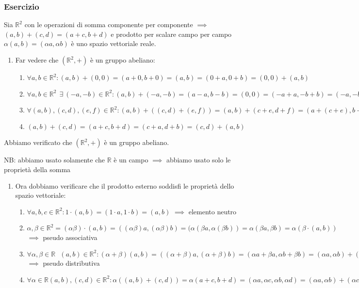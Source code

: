 \documentclass[../main.tex]{subfiles}
\begin{document}
\subsubsection{Esercizio}
Sia $\mathbb{R}^2$ con le operazioni di somma componente per componente
$\implies$ $(a, b) + (c, d) = (a+c, b+d)$ e prodotto per scalare campo per
campo $\alpha(a,b) = (\alpha a, \alpha b)$ è uno spazio vettoriale reale.

\begin{enumerate}
    \item Far vedere che $(\mathbb{R}^2,+)$ è un gruppo abeliano:
          \begin{enumerate}
              \item $\forall a,b \in \mathbb{R}^2 : (a,b)+(0,0) = (a+0, b+0) = (a,b) = (0+a, 0+b) = (0,0)+(a,b)$
              \item $\forall a,b \in \mathbb{R}^2 \ \ \exists \ (-a, -b) \in \mathbb{R}^2:(a,b)+(-a, -b) = (a-a, b-b) = (0,0) = (-a+a, -b+b) = (-a, -b)+(a,b)$
              \item  $\forall(a,b),(c,d),(e,f) \in \mathbb{R}^2 : (a,b)+ ((c,d)+(e,f)) = (a,b) + (c+e, d+f) = (a+ (c+e), b+ (d+f)) = ((a+c)+e, (b+d)+f) = (a+c, b+d)+(e,f)=((a,b)+(c,d))+(e,f)$
              \item  $(a,b)+(c,d)=(a+c, b+d)=(c+a,d+b)=(c,d)+(a,b)$
          \end{enumerate}
\end{enumerate}

Abbiamo verificato che $(\mathbb{R}^2,+)$ è un gruppo abeliano.

NB\@: abbiamo usato solamente che $\mathbb{R}$ è un campo $\implies$ abbiamo
usato solo le proprietà della somma
\begin{enumerate}
    \item Ora dobbiamo verificare che il prodotto esterno soddisfi le proprietà dello
          spazio vettoriale:
          \begin{enumerate}
              \item $\forall a,b,c \in \mathbb{R}^2 : 1\cdot(a,b)=(1\cdot a, 1\cdot b) = (a,b)$ $\implies$ elemento neutro
              \item $\alpha,\beta \in \mathbb{R}^2 = (\alpha\beta)\cdot(a,b)=((\alpha\beta)a, (\alpha\beta)b) = (\alpha(\beta a, \alpha(\beta b)) = \alpha(\beta a, \beta b) = \alpha(\beta \cdot(a,b))$ $\implies$ pseudo associativa
              \item $\forall \alpha,\beta\in\mathbb{R} \ \ \ (a,b) \in \mathbb{R}^2 : (\alpha+\beta)(a,b) = ((\alpha+\beta)a, (\alpha+\beta)b)=(\alpha a+\beta a, \alpha b + \beta b) = (\alpha a, \alpha b)+(\beta a, \beta b) = \alpha(a,b) + \beta(a,b)$ $\implies$ pseudo distributiva
              \item $\forall \alpha \in \mathbb{R} (a,b) ,(c,d) \in \mathbb{R}^2 : \alpha((a,b)+(c,d)) = \alpha(a+c,b+d)=(\alpha a, \alpha c, \alpha b, \alpha d)=(\alpha a, \alpha b) + (\alpha c, \alpha d) = \alpha(a,b)+\alpha(c,d)$
          \end{enumerate}

\end{enumerate}
\end{document}
